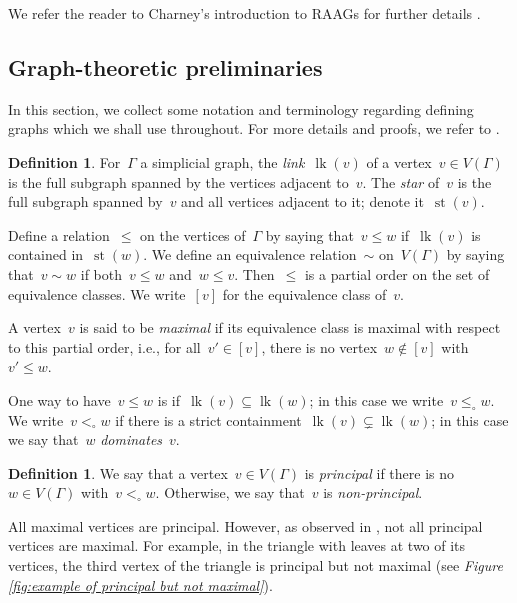 \documentclass[11pt]{amsart}
\theoremstyle{definition}
\theoremstyle{definition}
\theoremstyle{definition}
\theoremstyle{definition}
\newtheorem{definition}[theorem]{Definition}
\newcommand{\link}[1]{\operatorname{lk}({#1})} %
\newcommand{\str}[1]{\operatorname{st}({#1})} %
\begin{document}
We refer the reader to Charney's introduction to RAAGs for further details \cite{CharneyRAAGsSurvey07}. 

\subsection{Graph-theoretic preliminaries}\label{subsec:graph-theoretic preliminaries}

In this section, we collect some notation and terminology regarding defining graphs which we shall use throughout. For more details and proofs, we refer to \cite{CharneyVogtmannFinitenessProperties09}.

\begin{definition}\label{def:link and star}
    For~$\Gamma$ a simplicial graph, the \emph{link}~$\link{v}$ of a vertex~$v \in V(\Gamma)$ is the full subgraph spanned by the vertices adjacent to~$v$. The \emph{star} of~$v$ is the full subgraph spanned by~$v$ and all vertices adjacent to it; denote it~$\str{v}$.
\end{definition}


Define a relation~$\leq$ on the vertices of~$\Gamma$ by saying that~$v \leq w$ if~$\link{v}$ is contained in~$\str{w}$. We define an equivalence relation~$\sim$ on~$V(\Gamma)$ by saying that~$v \sim w$ if both~$v \leq w$ and~$w \leq v$. Then~$\leq$ is a partial order on the set of equivalence classes. We write~$[v]$ for the equivalence class of~$v$. 

A vertex~$v$ is said to be \emph{maximal} if its equivalence class is maximal with respect to this partial order, i.e., for all~$v' \in [v]$, there is no vertex~$w \notin [v]$ with~$v' \leq w$.

One way to have~$v \leq w$ is if~$\link{v} \subseteq \link{w}$; in this case we write~$v \leq_\circ w$. We write~$v <_\circ w$ if there is a strict containment~$\link{v} \subsetneq \link{w}$; in this case we say that~$w$ \emph{dominates}~$v$. 

\begin{definition}\label{def:principal vertex}
    We say that a vertex~$v \in V(\Gamma)$ is \emph{principal} if there is no~$w \in V(\Gamma)$ with~$v <_\circ w$. Otherwise, we say that~$v$ is \emph{non-principal}.
\end{definition}

All maximal vertices are principal. However, as observed in \cite{MillardVogtmannCubeComplexes21}, not all principal vertices are maximal. For example, in the triangle with leaves at two of its vertices, the third vertex of the triangle is principal but not maximal (see \emph{Figure \ref{fig:example of principal but not maximal}}).
\end{document}
